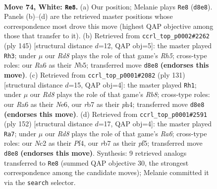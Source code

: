 \documentclass[11pt]{article}
\begin{document}
\clearpage

\begin{figure}[p]\centering
\begin{subfigure}{0.46\textwidth}\centering
\resizebox{\linewidth}{!}{%
\newchessgame
\chessboard[
  setfen={3R4/1r4bk/R7/8/2P5/8/2N3K1/8 w - - 68 74},
  showmover=false,
  pgfstyle=straightmove, color=movearrow, markmove={d8-e8}
]}
\caption{}
\end{subfigure}\hfill
\begin{subfigure}{0.46\textwidth}\centering
\resizebox{\linewidth}{!}{%
\newchessgame
\chessboard[
  setfen={8/8/8/1n2k3/7r/3KB3/R7/8 b - - 0 73},
  showmover=false,
  pgfstyle=straightmove, color=movearrow, markmove={h4-h3}
]}
\caption{}
\end{subfigure}
\\[4pt]
\begin{subfigure}{0.46\textwidth}\centering
\resizebox{\linewidth}{!}{%
\newchessgame
\chessboard[
  setfen={8/4k3/4n3/8/2K4P/2B5/6R1/1r6 b - - 0 66},
  showmover=false,
  pgfstyle=straightmove, color=movearrow, markmove={b1-h1}
]}
\caption{}
\end{subfigure}\hfill
\begin{subfigure}{0.46\textwidth}\centering
\resizebox{\linewidth}{!}{%
\newchessgame
\chessboard[
  setfen={8/4bk2/R7/5p1K/5P2/8/8/8 w - - 46 77},
  showmover=false,
  pgfstyle=straightmove, color=movearrow, markmove={a6-a7}
]}
\caption{}
\end{subfigure}
\caption{\textbf{Move 74, White: \texttt{Re8}.} (a) Our position; Melanie plays \texttt{Re8} (\texttt{d8e8}). Panels (b)--(d) are the retrieved master positions whose correspondence most drove this move (highest QAP objective among those that transfer to it). (b) Retrieved from \texttt{ccrl\_top\_p0002\#2262} (ply 145) [structural distance $d$=12, QAP obj=5]: the master played \texttt{Rh3}; under $\mu$ our \emph{Rd8} plays the role of that game's \emph{Rh5}; cross-type roles: our \emph{R}a6 as their \emph{N}b5; transferred move \texttt{d8e8} \textbf{(endorses this move)}. (c) Retrieved from \texttt{ccrl\_top\_p0001\#2082} (ply 131) [structural distance $d$=15, QAP obj=4]: the master played \texttt{Rh1}; under $\mu$ our \emph{Rd8} plays the role of that game's \emph{Rb8}; cross-type roles: our \emph{R}a6 as their \emph{N}e6, our \emph{r}b7 as their \emph{p}h4; transferred move \texttt{d8e8} \textbf{(endorses this move)}. (d) Retrieved from \texttt{ccrl\_top\_p0001\#2591} (ply 152) [structural distance $d$=17, QAP obj=4]: the master played \texttt{Ra7}; under $\mu$ our \emph{Rd8} plays the role of that game's \emph{Ra6}; cross-type roles: our \emph{N}c2 as their \emph{P}f4, our \emph{r}b7 as their \emph{p}f5; transferred move \texttt{d8e8} \textbf{(endorses this move)}. Synthesis: 9 retrieved analogs transferred to \texttt{Re8} (summed QAP objective 30, the strongest correspondence among the candidate moves); Melanie committed it via the \texttt{search} selector.}
\label{fig:thought-m146}
\end{figure}
\end{document}
